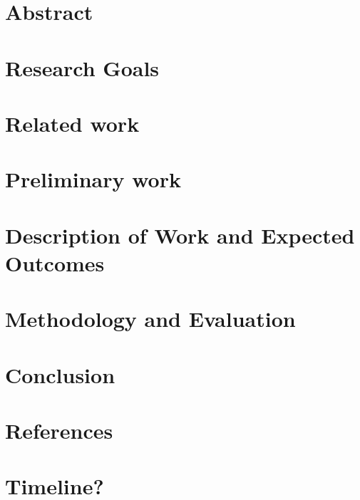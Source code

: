 \documentclass[11pt,a4paper]{article}
\title{\todo{Title}}
\author{Lukas Schmelzeisen \\ \texttt{lukas@uni-koblenz.de}}
\date{\today}
\begin{document}
\maketitle

\section{Abstract}

\section{Research Goals}

\section{Related work}

\section{Preliminary work}

\section{Description of Work and Expected Outcomes}

\section{Methodology and Evaluation}

\section{Conclusion}

\section{References}

\section{Timeline?}
\end{document}
